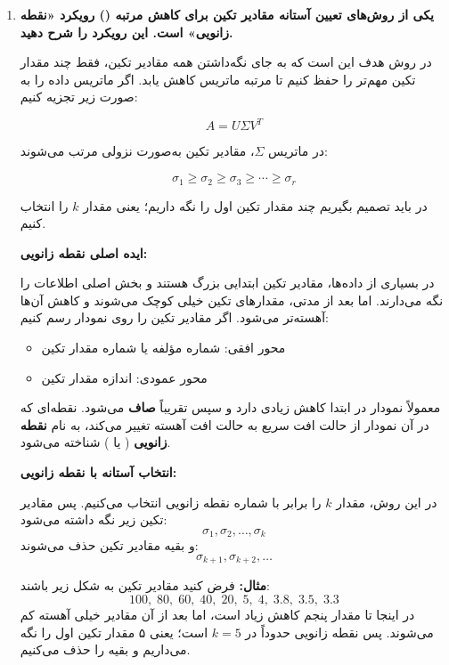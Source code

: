 \documentclass{article}
\begin{document}
\begin{enumerate}
    \newpage
    \item \textbf{یکی از روش‌های تعیین آستانه مقادیر تکین برای کاهش مرتبه () رویکرد «نقطه زانویی» است. این رویکرد را شرح دهید.}

    \vspace{0.3cm}

    در روش  هدف این است که به جای نگه‌داشتن همه مقادیر تکین، فقط چند مقدار تکین مهم‌تر را حفظ کنیم تا مرتبه ماتریس کاهش یابد. اگر ماتریس داده را به صورت زیر تجزیه کنیم:

    \[
    A = U\Sigma V^{T}
    \]

    در ماتریس $\Sigma$، مقادیر تکین به‌صورت نزولی مرتب می‌شوند:

    \[
    \sigma_{1} \geq \sigma_{2} \geq \sigma_{3} \geq \cdots \geq \sigma_{r}
    \]

    در  باید تصمیم بگیریم چند مقدار تکین اول را نگه داریم؛ یعنی مقدار $k$ را انتخاب کنیم.

    \vspace{0.4cm}
    \textbf{ایده اصلی نقطه زانویی:}
    \vspace{0.2cm}
    
    در بسیاری از داده‌ها، مقادیر تکین ابتدایی بزرگ هستند و بخش اصلی اطلاعات را نگه می‌دارند. اما بعد از مدتی، مقدارهای تکین خیلی کوچک می‌شوند و کاهش آن‌ها آهسته‌تر می‌شود. اگر مقادیر تکین را روی نمودار رسم کنیم:
    \begin{itemize}
        \item محور افقی: شماره مؤلفه یا شماره مقدار تکین
        \item محور عمودی: اندازه مقدار تکین
    \end{itemize}

    معمولاً نمودار در ابتدا کاهش زیادی دارد و سپس تقریباً \textbf{صاف} می‌شود. نقطه‌ای که در آن نمودار از حالت افت سریع به حالت افت آهسته تغییر می‌کند، به نام \textbf{نقطه زانویی} ( یا ) شناخته می‌شود.

    \vspace{0.4cm}
    \textbf{انتخاب آستانه با نقطه زانویی:}
    \vspace{0.2cm}
    
    در این روش، مقدار $k$ را برابر با شماره نقطه زانویی انتخاب می‌کنیم.
    پس مقادیر تکین زیر نگه داشته می‌شود:
    \[
    \sigma_{1}, \sigma_{2}, \ldots, \sigma_{k}
    \]
    و بقیه مقادیر تکین حذف می‌شوند:
    \[
    \sigma_{k+1}, \sigma_{k+2}, \ldots
    \]

    \textbf{مثال:}
    فرض کنید مقادیر تکین به شکل زیر باشند:
    \[
    100,\;80,\;60,\;40,\;20,\;5,\;4,\;3.8,\;3.5,\;3.3
    \]
    در اینجا تا مقدار پنجم کاهش زیاد است، اما بعد از آن مقادیر خیلی آهسته کم می‌شوند. پس نقطه زانویی حدوداً در $k = 5$ است؛ یعنی ۵ مقدار تکین اول را نگه می‌داریم و بقیه را حذف می‌کنیم.


\end{enumerate}
\end{document}

